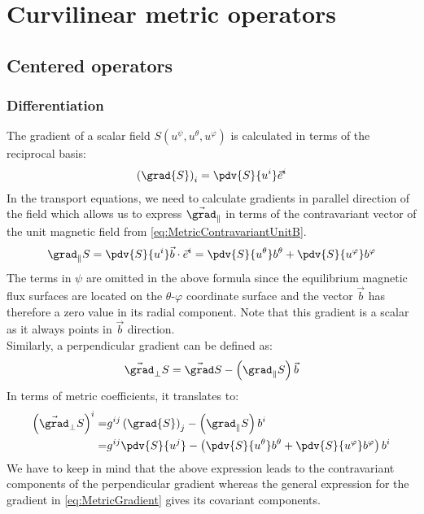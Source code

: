 \chapter{Curvilinear metric operators}
\label{app:CurvilinearMetric}

\section{Centered operators}
\label{sec:app_centeredOperators}

\subsection{Differentiation}
The gradient of a scalar field $S(u^\psi, u^\theta, u^\varphi)$ is calculated in terms of the reciprocal basis: 
\begin{align}
	\left(\grad{S}\right)_i = \pdv{S}{u^i}\vec{e}^i \label{eq:MetricGradient}
\end{align}
In the transport equations, we need to calculate gradients in parallel direction of the field which allows us to express $\vec{\grad}_\parallel$ in terms of the contravariant vector of the unit magnetic field from \autoref{eq:MetricContravariantUnitB}.
\begin{align}
	\grad_\parallel S = \pdv{S}{u^i}\vec{b}\cdot\vec{e}^i = \pdv{S}{u^\theta}b^\theta + \pdv{S}{u^\varphi}b^\varphi \label{eq:MetricParallelGradient}
\end{align}
The terms in $\psi$ are omitted in the above formula since the equilibrium magnetic flux surfaces are located on the $\theta$-$\varphi$ coordinate surface and the vector $\vec{b}$ has therefore a zero value in its radial component. Note that this gradient is a scalar as it always points in $\vec{b}$ direction. \\
Similarly, a perpendicular gradient can be defined as: 
\begin{equation*}
	\vec{\grad}_\perp S = \vec{\grad} S - \left(\grad_\parallel S\right)\vec{b}
\end{equation*}
In terms of metric coefficients, it translates to: 
\begin{align}
	\label{eq:MetricPerpendicularGradient}
	\left(\vec{\grad}_\perp S\right)^i =& g^{ij}\left(\grad{S}\right)_j - \left(\grad_\parallel S\right)b^i \nonumber \\
	=& g^{ij}\pdv{S}{u^j} - \left(\pdv{S}{u^\theta}b^\theta + \pdv{S}{u^\varphi}b^\varphi\right)b^i
\end{align}
We have to keep in mind that the above expression leads to the contravariant components of the perpendicular gradient whereas the general expression for the gradient in \autoref{eq:MetricGradient} gives its covariant components. \\

